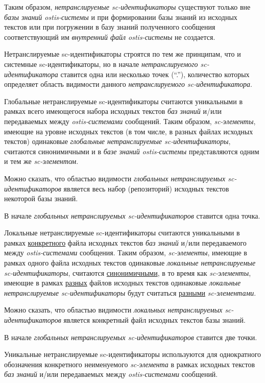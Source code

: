 Таким образом, \textit{нетранслируемые sc-идентификаторы} существуют только вне \textit{базы знаний ostis-системы} и при формировании базы знаний из исходных текстов или при погружении в базу знаний полученного сообщения соответствующий им \textit{внутренний файл ostis-системы} не создается.

Нетранслируемые sc-идентификаторы строятся по тем же принципам, что и системные sc-идентификаторы, но в начале \textit{нетранслируемого sc-идентификатора} ставится одна или несколько точек (``.''), количество которых определяет область видимости данного \textit{нетранслируемого sc-идентификатора}.

Глобальные нетранслируемые sc-идентификаторы считаются уникальными в рамках всего имеющегося набора исходных текстов \textit{баз знаний} и/или передаваемых между \textit{ostis-системами} сообщений. Таким образом, \textit{sc-элементы}, имеющие на уровне исходных текстов (в том числе, в разных файлах исходных текстов) одинаковые \textit{глобальные нетранслируемые sc-идентификаторы}, считаются синонимичными и в \textit{базе знаний ostis-системы} представляются одним и тем же \textit{sc-элементом}.

Можно сказать, что областью видимости \textit{глобальных нетранслируемых sc-идентификаторов} является весь набор (репозиторий) исходных текстов некоторой базы знаний.

В начале \textit{глобальных нетранслируемых sc-идентификаторов} ставится одна точка.

Локальные нетранслируемые sc-идентификаторы считаются уникальными в рамках \uline{конкретного} файла исходных текстов \textit{баз знаний} и/или передаваемого между \textit{ostis-системами} сообщения. Таким образом, \textit{sc-элементы}, имеющие в рамках одного файла исходных текстов одинаковые \textit{локальные нетранслируемые sc-идентификаторы}, считаются \uline{синонимичными}, в то время как \textit{sc-элементы}, имеющие в рамках \uline{разных} файлов исходных текстов одинаковые \textit{локальные нетранслируемые sc-идентификаторы} будут считаться \uline{разными} \textit{sc-элементами}.

Можно сказать, что областью видимости \textit{локальных нетранслируемых sc-идентификаторов} является конкретный файл исходных текстов базы знаний.

В начале \textit{глобальных нетранслируемых sc-идентификаторов} ставится две точки.

Уникальные нетранслируемые sc-идентификаторы используются для однократного обозначения конкретного неименуемого \textit{sc-элемента} в рамках исходных текстов \textit{баз знаний} и/или передаваемых между \textit{ostis-системами} сообщений.

